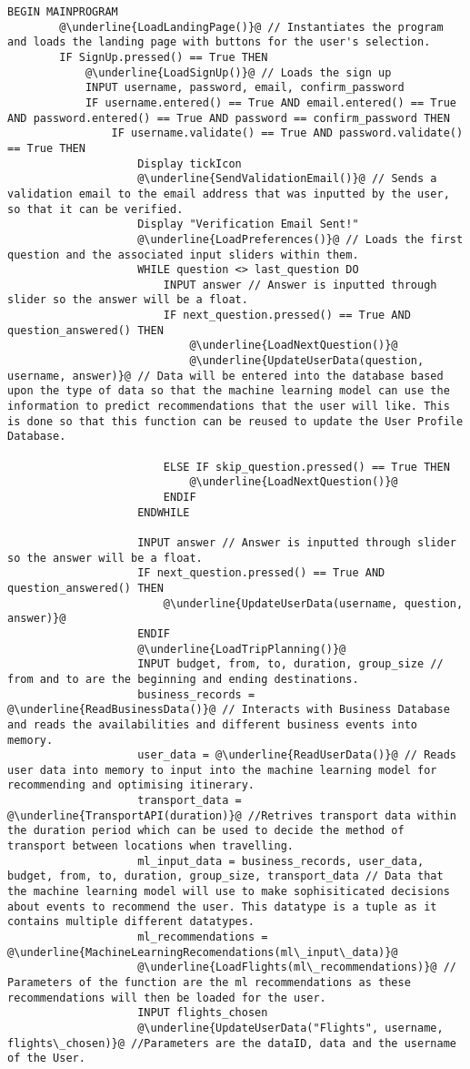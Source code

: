\begin{lstlisting}[caption=Main Program, escapechar=\@]
	BEGIN MAINPROGRAM
		@\underline{LoadLandingPage()}@ // Instantiates the program and loads the landing page with buttons for the user's selection.
		IF SignUp.pressed() == True THEN
			@\underline{LoadSignUp()}@ // Loads the sign up 
			INPUT username, password, email, confirm_password
			IF username.entered() == True AND email.entered() == True AND password.entered() == True AND password == confirm_password THEN
				IF username.validate() == True AND password.validate() == True THEN
					Display tickIcon
					@\underline{SendValidationEmail()}@ // Sends a validation email to the email address that was inputted by the user, so that it can be verified.
					Display "Verification Email Sent!"
					@\underline{LoadPreferences()}@ // Loads the first question and the associated input sliders within them.
					WHILE question <> last_question DO
						INPUT answer // Answer is inputted through slider so the answer will be a float.
						IF next_question.pressed() == True AND question_answered() THEN
							@\underline{LoadNextQuestion()}@
							@\underline{UpdateUserData(question, username, answer)}@ // Data will be entered into the database based upon the type of data so that the machine learning model can use the information to predict recommendations that the user will like. This is done so that this function can be reused to update the User Profile Database.

						ELSE IF skip_question.pressed() == True THEN  
							@\underline{LoadNextQuestion()}@
						ENDIF
					ENDWHILE

					INPUT answer // Answer is inputted through slider so the answer will be a float.
					IF next_question.pressed() == True AND question_answered() THEN
						@\underline{UpdateUserData(username, question, answer)}@
					ENDIF
					@\underline{LoadTripPlanning()}@
					INPUT budget, from, to, duration, group_size // from and to are the beginning and ending destinations.
					business_records = @\underline{ReadBusinessData()}@ // Interacts with Business Database and reads the availabilities and different business events into memory.
					user_data = @\underline{ReadUserData()}@ // Reads user data into memory to input into the machine learning model for recommending and optimising itinerary.
					transport_data = @\underline{TransportAPI(duration)}@ //Retrives transport data within the duration period which can be used to decide the method of transport between locations when travelling.
					ml_input_data = business_records, user_data, budget, from, to, duration, group_size, transport_data // Data that the machine learning model will use to make sophisiticated decisions about events to recommend the user. This datatype is a tuple as it contains multiple different datatypes.
					ml_recommendations = @\underline{MachineLearningRecomendations(ml\_input\_data)}@
					@\underline{LoadFlights(ml\_recommendations)}@ // Parameters of the function are the ml recommendations as these recommendations will then be loaded for the user.
					INPUT flights_chosen
					@\underline{UpdateUserData("Flights", username, flights\_chosen)}@ //Parameters are the dataID, data and the username of the User.


\end{lstlisting}
